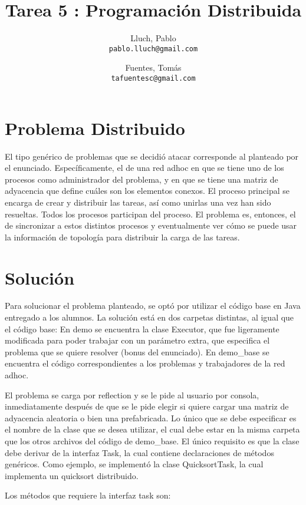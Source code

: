 \documentclass[12pt,spanish]{article}
\author{
  Lluch, Pablo\\
  \texttt{pablo.lluch@gmail.com}
  \and
  Fuentes, Tomás\\
  \texttt{tafuentesc@gmail.com}
}
\title{Tarea 5 : Programación Distribuida}
\begin{document}
	\maketitle
	\newpage

	\section{Problema Distribuido}

	El tipo genérico de problemas que se decidió atacar corresponde al planteado por el enunciado. Específicamente, el de una red adhoc en que se tiene uno de los procesos como administrador del problema, y en que se tiene una matriz de adyacencia que define cuáles son los elementos conexos. El proceso principal se encarga de crear y distribuir las tareas, así como unirlas una vez han sido resueltas. Todos los procesos participan del proceso. El problema es, entonces, el de sincronizar a estos distintos procesos y eventualmente ver cómo se puede usar la información de topología para distribuir la carga de las tareas.

	\section{Solución}

	Para solucionar el problema planteado, se optó por utilizar el código base en Java entregado a los alumnos. La solución está en dos carpetas distintas, al igual que el código base: En demo se encuentra la clase Executor, que fue ligeramente modificada para poder trabajar con un parámetro extra, que especifica el problema que se quiere resolver (bonus del enunciado). En demo\_base se encuentra el código correspondientes a los problemas y trabajadores de la red adhoc.

	El problema se carga por reflection y se le pide al usuario por consola, inmediatamente después de que se le pide elegir si quiere cargar una matriz de adyacencia aleatoria o bien una prefabricada. Lo único que se debe especificar es el nombre de la clase que se desea utilizar, el cual debe estar en la misma carpeta que los otros archivos del código de demo\_base. El único requisito es que la clase debe derivar de la interfaz Task, la cual contiene declaraciones de métodos genéricos. Como ejemplo, se implementó la clase QuicksortTask, la cual implementa un quicksort distribuido.

	Los métodos que requiere la interfaz task son:
\end{document}
